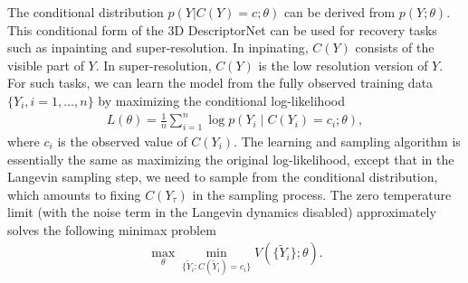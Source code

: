 \documentclass[10pt,twocolumn,letterpaper]{article}
\def\tY{\tilde{Y}}
\begin{document}
 The conditional distribution $p(Y | C(Y) = c; \theta)$ can be derived from $p(Y; \theta)$. This conditional form of the 3D DescriptorNet can be used for recovery tasks such as inpainting and super-resolution. In inpinating, $C(Y)$ consists of the visible part of $Y$. In super-resolution, $C(Y)$ is the low resolution version of $Y$. For such tasks, we can learn the model from the fully observed training data $\{Y_i, i = 1, ..., n\}$ by maximizing the conditional log-likelihood 
 \begin{eqnarray}
     L(\theta) = \frac{1}{n} \sum_{i=1}^{n} \log p(Y_i \mid C(Y_i) = c_i; \theta), 
 \end{eqnarray} 
 where $c_i$ is the observed value of $C(Y_i)$. 
The learning and sampling algorithm is essentially the same as maximizing the original log-likelihood, except that in the Langevin sampling step, we need to sample from the conditional distribution, which amounts to fixing $C(Y_\tau)$ in the sampling process. 
The  zero temperature limit (with the noise term in the Langevin dynamics disabled) approximately solves the following minimax problem 
  \begin{eqnarray} 
\max_{\theta} \min_{\{\tY_i: C(\tY_i) = {c}_i\}}  V(\{\tY_i\}; \theta).  \label{eq:minimax1}
\end{eqnarray}

\end{document}
